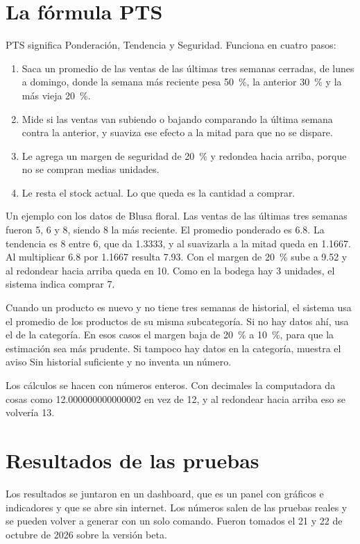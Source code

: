 \documentclass[12pt,letterpaper]{article}
\begin{document}
\section{La fórmula PTS}

PTS significa Ponderación, Tendencia y Seguridad. Funciona en cuatro pasos:

\begin{enumerate}
\item Saca un promedio de las ventas de las últimas tres semanas cerradas, de lunes a domingo, donde la semana más reciente pesa 50~\%, la anterior 30~\% y la más vieja 20~\%.
\item Mide si las ventas van subiendo o bajando comparando la última semana contra la anterior, y suaviza ese efecto a la mitad para que no se dispare.
\item Le agrega un margen de seguridad de 20~\% y redondea hacia arriba, porque no se compran medias unidades.
\item Le resta el stock actual. Lo que queda es la cantidad a comprar.
\end{enumerate}

Un ejemplo con los datos de Blusa floral. Las ventas de las últimas tres semanas fueron 5, 6 y 8, siendo 8 la más reciente. El promedio ponderado es 6.8. La tendencia es 8 entre 6, que da 1.3333, y al suavizarla a la mitad queda en 1.1667. Al multiplicar 6.8 por 1.1667 resulta 7.93. Con el margen de 20~\% sube a 9.52 y al redondear hacia arriba queda en 10. Como en la bodega hay 3 unidades, el sistema indica comprar 7.

Cuando un producto es nuevo y no tiene tres semanas de historial, el sistema usa el promedio de los productos de su misma subcategoría. Si no hay datos ahí, usa el de la categoría. En esos casos el margen baja de 20~\% a 10~\%, para que la estimación sea más prudente. Si tampoco hay datos en la categoría, muestra el aviso Sin historial suficiente y no inventa un número.

Los cálculos se hacen con números enteros. Con decimales la computadora da cosas como 12.000000000000002 en vez de 12, y al redondear hacia arriba eso se volvería 13.

\section{Resultados de las pruebas}

Los resultados se juntaron en un dashboard, que es un panel con gráficos e indicadores y que se abre sin internet. Los números salen de las pruebas reales y se pueden volver a generar con un solo comando. Fueron tomados el 21 y 22 de octubre de 2026 sobre la versión beta.
\end{document}
